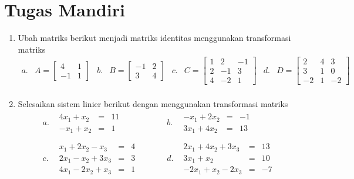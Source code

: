 \section{Tugas Mandiri}
		\begin{enumerate}
		\item Ubah matriks berikut menjadi matriks identitas menggunakan transformasi matriks
		$$
		\begin{array}{llllllllll} 
			a. & 	A=\left[
			\begin{array}{rr} 
				4 & 1\\
				-1 &1 
			\end{array} 
			\right]
			& b. & B=	\left[
			\begin{array}{rr} 
				-1 & 2\\
				3  & 4 
			\end{array} 
			\right]
			& c. & C=	\left[
			\begin{array}{rrr} 
				1 & 2 & -1\\
				2 & -1 & 3\\
				4 & -2 & 1 
			\end{array} 
			\right]
			& d. &  D=\left[
			\begin{array}{rrr} 
				2 & 4 & 3\\
				3 & 1 & 0\\
				-2 &1 & -2 
			\end{array} 
			\right]
			\\
		\end{array} 
		$$
		\item Selesaikan sistem linier berikut dengan menggunakan transformasi matriks\\ %
				$$
		\begin{array}{lclc} 
			a. & 
			\begin{array}{rcr} 
				4x_1 + x_2&=& 11 \\
				-x_1 + x_2&=& 1 
			\end{array} ~~~~~~~~~~~~
			& b. & 
			\begin{array}{rcr} 
				-x_1 + 2x_2&=& -1 \\
				3x_1 + 4x_2&=& 13 
			\end{array} \\
		\\
			c. & \begin{array}{rcr} 
				x_1 + 2x_2  - x_3 &=& 4 \\
				2x_1 - x_2  + 3x_3 &=& 3  \\
				4x_1 - 2x_2  + x_3 &=& 1 
			\end{array} ~~~~~~~~~~~~
			& d. &  \begin{array}{lcr} 
				2x_1 + 4x_2  + 3x_3 &=& 13 \\
				3x_1 + x_2  &=& 10  \\
				-2x_1 + x_2  - 2x_3 &=& -7 
			\end{array}
		\end{array}
		$$
		\end{enumerate}